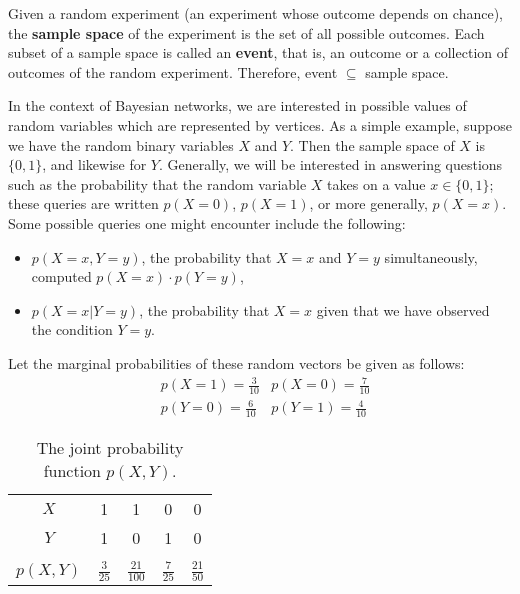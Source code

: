 \begin{definition}
Given a random experiment (an experiment whose outcome depends on chance), the \textbf{sample space} of the experiment is the set of all possible outcomes. Each subset of a sample space is called an \textbf{event}, that is, an outcome or a collection of outcomes of the random experiment. Therefore, event $\subseteq$ sample space. 
\end{definition}



\begin{example}
 In the context of Bayesian networks, we are interested in possible values of random variables which are represented by vertices. As a simple example, suppose we have the random binary variables $X$ and $Y$. Then the sample space of $X$ is $\{0,1\}$, and likewise for $Y$.  Generally, we will be interested in answering questions such as the probability that the random variable $X$ takes on a value $x \in \{0,1\}$; these queries are written $p(X=0)$, $p(X=1)$, or more generally, $p(X=x)$. Some possible queries one might encounter include the following:
\begin{itemize}
\item $p(X=x,Y=y)$, the probability that $X=x$ and $Y=y$ simultaneously, computed $p(X=x)\cdot p(Y=y)$,
\item $p(X=x|Y=y)$, the probability that $X=x$ given that we have observed the condition $Y=y$.
\end{itemize}

Let the marginal probabilities of these random vectors be given as follows:
\begin{align*}
&p(X=1) = \frac{3}{10} 	& p(X=0) = \frac{7}{10} \\
&p(Y = 0) = \frac{6}{10} 	&p(Y=1) = \frac{4}{10}
\end{align*}


\begin{table}[h!]
  \begin{center}
    \begin{tabular}{  c | c c c c}
	$X$ 		& 1 & 1 & 0 & 0 \\
	$Y$		& 1 & 0 & 1 & 0 \\
	\hline \\[-1em]
	$p(X,Y)$	&$ \frac{3}{25}$ & $\frac{21}{100}$ & $\frac{7}{25}$ & $\frac{21}{50}$
    \end{tabular}
  \end{center}
  \caption{The joint probability function $p(X,Y)$.}
  \label{jprobtable}
  \end{table}


\end{example}
